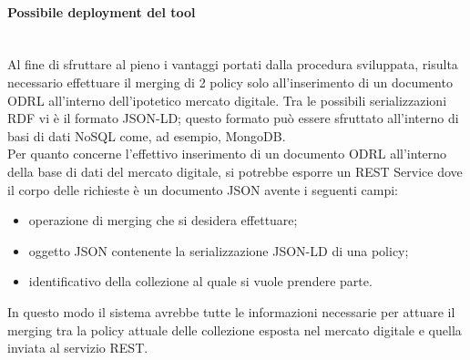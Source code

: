 \documentclass[12pt,a4paper,twoside]{book}
\begin{document}
\paragraph{Possibile deployment del tool}\mbox{}\\
Al fine di sfruttare al pieno i vantaggi portati dalla procedura sviluppata, risulta necessario effettuare il merging di 2 policy solo all'inserimento di un documento ODRL all'interno dell'ipotetico mercato digitale. Tra le possibili serializzazioni RDF vi è il formato JSON-LD; questo formato può essere sfruttato all'interno di basi di dati NoSQL come, ad esempio, MongoDB.\\
Per quanto concerne l'effettivo inserimento di un documento ODRL all'interno della base di dati del mercato digitale, si potrebbe esporre un REST Service dove il corpo delle richieste è un documento JSON avente i seguenti campi:
\begin{itemize}
\item operazione di merging che si desidera effettuare;
\item oggetto JSON contenente la serializzazione JSON-LD di una policy;
\item identificativo della collezione al quale si vuole prendere parte.
\end{itemize}
In questo modo il sistema avrebbe tutte le informazioni necessarie per attuare il merging tra la policy attuale delle collezione esposta nel mercato digitale e quella inviata al servizio REST.
\end{document}
